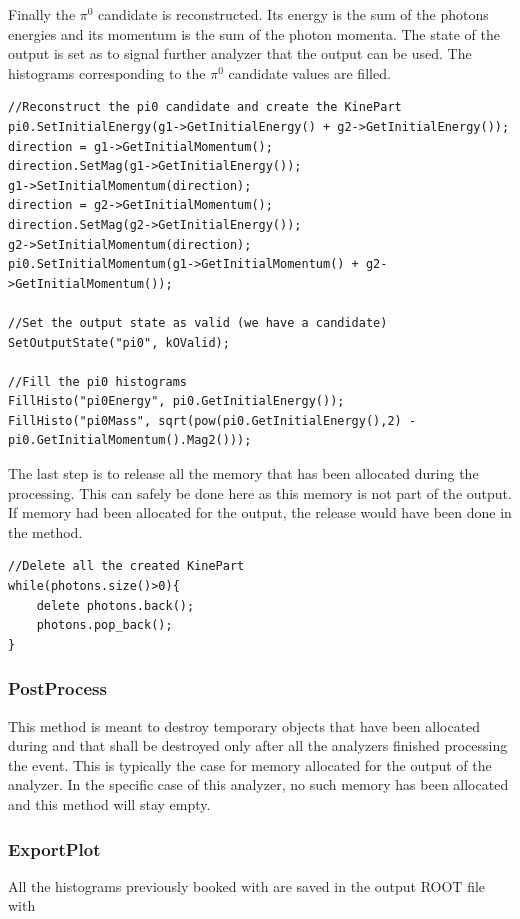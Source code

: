 Finally the $\pi^0$ candidate is reconstructed. Its energy is the sum of the photons energies and
its momentum  is the sum of the photon momenta. The state of the output is set as 
to signal further analyzer that the output can be used. The histograms corresponding to the $\pi^0$
candidate values are filled.
\begin{lstlisting}
//Reconstruct the pi0 candidate and create the KinePart
pi0.SetInitialEnergy(g1->GetInitialEnergy() + g2->GetInitialEnergy());
direction = g1->GetInitialMomentum();
direction.SetMag(g1->GetInitialEnergy());
g1->SetInitialMomentum(direction);
direction = g2->GetInitialMomentum();
direction.SetMag(g2->GetInitialEnergy());
g2->SetInitialMomentum(direction);
pi0.SetInitialMomentum(g1->GetInitialMomentum() + g2->GetInitialMomentum());

//Set the output state as valid (we have a candidate)
SetOutputState("pi0", kOValid);

//Fill the pi0 histograms
FillHisto("pi0Energy", pi0.GetInitialEnergy());
FillHisto("pi0Mass", sqrt(pow(pi0.GetInitialEnergy(),2) - pi0.GetInitialMomentum().Mag2()));
\end{lstlisting}


The last step is to release all the memory that has been allocated during the processing. This can
safely be done here as this memory is not part of the output. If memory had been allocated for the
output, the release would have been done in the  method.
\begin{lstlisting}
//Delete all the created KinePart
while(photons.size()>0){
	delete photons.back();
	photons.pop_back();
}
\end{lstlisting}

\subsubsection{PostProcess}
This method is meant to destroy temporary objects that have been allocated during 
and that shall be destroyed only after all the analyzers finished processing the event. This is
typically the case for memory allocated for the output of the analyzer. In the specific case of this
analyzer, no such memory has been allocated and this method will stay empty.

\subsubsection{ExportPlot}
All the histograms previously booked with  are saved in the output ROOT file with

